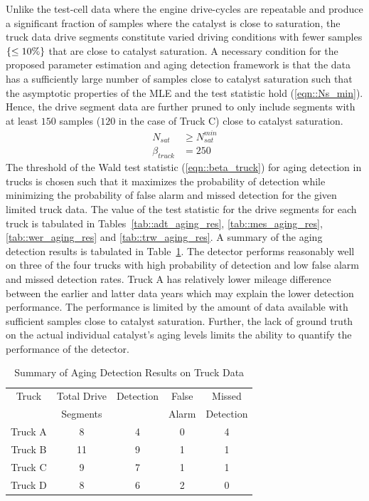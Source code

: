 Unlike the test-cell data where the engine drive-cycles are repeatable and produce a significant fraction of samples where the catalyst is close to saturation, the truck data drive segments constitute varied driving conditions with fewer samples $\left\{ \leq 10\% \right\}$ that are close to catalyst saturation. A necessary condition for the proposed parameter estimation and aging detection framework is that the data has a sufficiently large number of samples close to catalyst saturation such that the asymptotic properties of the MLE and the test statistic hold (\ref{eqn::Ns_min}). Hence, the drive segment data are further pruned to only include segments with at least $150$ samples ($120$ in the case of Truck C) close to catalyst saturation.
\begin{align}
        N_{sat}       & \geq N_{sat}^{min} \label{eqn::Ns_min} \\
        \beta_{truck} & = 250 \label{eqn::beta_truck}
\end{align}
The threshold of the Wald test statistic (\ref{eqn::beta_truck}) for aging detection in trucks is chosen such that it
maximizes the probability of detection while minimizing the probability of false alarm and missed detection for the
given limited truck data. The value of the test statistic for the drive segments for each truck is tabulated in
Tables~\ref{tab::adt_aging_res}, \ref{tab::mes_aging_res}, \ref{tab::wer_aging_res} and \ref{tab::trw_aging_res}. A
summary of the aging detection results is tabulated in Table~\ref{tab::truck_aging_summary}. The detector performs
reasonably well on three of the four trucks with high probability of detection and low false alarm and missed detection
rates. Truck A has relatively lower mileage difference between the earlier and latter data years which may explain the
lower detection performance. The performance is limited by the amount of data available with sufficient samples close to
catalyst saturation. Further, the lack of ground truth on the actual individual catalyst's aging levels limits the
ability to quantify the performance of the detector.
\begin{table}[ht]
        \centering
        \caption{Summary of Aging Detection Results on Truck Data}
        \label{tab::truck_aging_summary}
        \begin{tabular}{c c c c c}
                \hline \hline
                Truck   & Total Drive & Detection & False & Missed    \\
                        & Segments    &           & Alarm & Detection \\\hline \hline
                Truck A & 8           & 4         & 0     & 4         \\
                Truck B & 11          & 9         & 1     & 1         \\
                Truck C & 9           & 7         & 1     & 1         \\
                Truck D & 8           & 6         & 2     & 0         \\
                \hline \hline
        \end{tabular}
\end{table}

